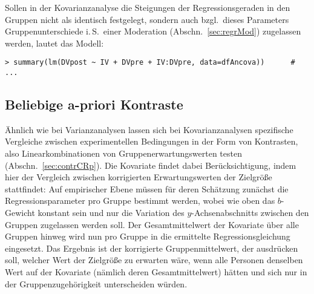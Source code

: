Sollen in der Kovarianzanalyse die Steigungen der Regressionsgeraden in den Gruppen nicht als identisch festgelegt, sondern auch bzgl.\ dieses Parameters Gruppenunterschiede i.\,S.\ einer Moderation (Abschn.\ \ref{sec:regrMod}) zugelassen werden, lautet das Modell:
\begin{lstlisting}
> summary(lm(DVpost ~ IV + DVpre + IV:DVpre, data=dfAncova))      # ...
\end{lstlisting}

\subsection{Beliebige a-priori Kontraste}

Ähnlich wie bei Varianzanalysen lassen sich bei Kovarianzanalysen spezifische Vergleiche zwischen experimentellen Bedingungen in der Form von Kontrasten, also Linearkombinationen von Gruppenerwartungswerten testen (Abschn.\ \ref{sec:contrCRp}). Die Kovariate findet dabei Berücksichtigung, indem hier der Vergleich zwischen korrigierten Erwartungswerten der Zielgröße stattfindet: Auf empirischer Ebene müssen für deren Schätzung zunächst die Regressionsparameter pro Gruppe bestimmt werden, wobei wie oben das $b$-Gewicht konstant sein und nur die Variation des $y$-Achsenabschnitts zwischen den Gruppen zugelassen werden soll. Der Gesamtmittelwert der Kovariate über alle Gruppen hinweg wird nun pro Gruppe in die ermittelte Regressionsgleichung eingesetzt. Das Ergebnis ist der korrigierte Gruppenmittelwert, der ausdrücken soll, welcher Wert der Zielgröße zu erwarten wäre, wenn alle Personen denselben Wert auf der Kovariate (nämlich deren Gesamtmittelwert) hätten und sich nur in der Gruppenzugehörigkeit unterscheiden würden.

